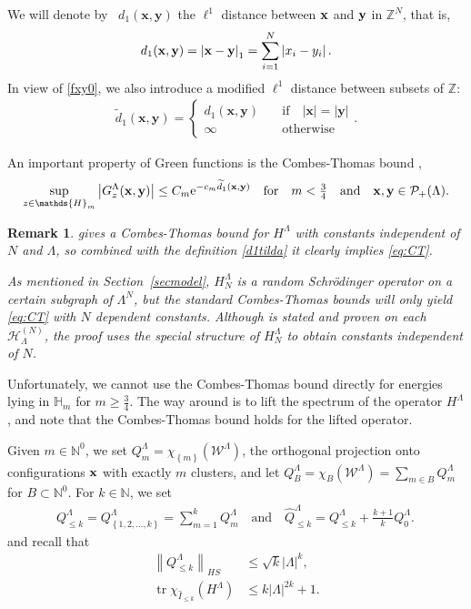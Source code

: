 \documentclass[12pt, a4paper,reqno]{amsart}
\numberwithin{equation}{section}
\newtheorem{remark}[theorem]{Remark}
\DeclareMathOperator{\tr}{tr}
\newcommand\N{\mathbb N}
\newcommand\Z{\mathbb Z}
\newcommand\cW{\mathcal{W}}
\newcommand\x{\mathbf{x}}
\newcommand\y{\mathbf{y}}
\newcommand\e{\mathrm{e}}
\newcommand\cH{\mathcal{H}}
\newcommand\cP{\mathcal{P}}
\newcommand\what{\widehat}
\newcommand\wtilde{\widetilde}
\newcommand\be{\begin{equation}\begin{aligned}}
\newcommand\ee{\end{aligned}\end{equation}}
\newcommand{\abs}[1]{\left\lvert #1 \right\rvert}
\newcommand{\norm}[1]{\left\lVert #1 \right\rVert}
\newcommand{\set}[1]{\left\{ #1 \right\}}
\newcommand{\pa}[1]{\left( #1 \right)}
\newcommand\La{\Lambda}
\newcommand{\eq}[1]{\eqref{#1}}
\newcommand{\up}[1]{^{\left(#1\right)}}
\newcommand{\qtx}[1]{\quad\text{#1}\quad}
\begin{document}
 We will denote by \  $d_1(\x,\y)$ the $\ell^1$ distance between ${\bf x}$ and ${\bf y}$ in $\Z^N$, that is, 
\be\label{eq:l1di}
d_1(\x,\y)=\abs{{\bf x}-{\bf y}}_1=\sum_{i=1}^N\abs{x_i-y_i}.
\ee
In view of \eq{fxy0}, we also introduce a modified  $\ell^1$ distance between subsets of $\Z$:
\be\label{d1tilda}
 \wtilde d_1(\x,\y)= \begin{cases} d_1(\x,\y) & \qtx{if} \abs{\x}=\abs{\y}\\
 \infty & \qtx{otherwise}
 \end{cases}.
\ee 

An important property of Green functions is  the Combes-Thomas bound \cite[Proposition 4.1]{EKS1}, 
 \be\label{eq:CT}
 \sup_{z\in \mathds{H}_m } \abs{G^\La_z({\bf x},{\bf y})}\le C_m \e^{-c_m \wtilde d_1(\x,\y)} \qtx{for} m<\tfrac 34 \qtx{and}
\x ,\y \in \cP_+(\La).
\ee 
\begin{remark}  \cite[Proposition 4.1]{EKS1}  gives a Combes-Thomas bound for $H^\La$ with constants independent of $N$ and $\La$, so combined with  the definition \eq{d1tilda} it clearly implies \eq{eq:CT}.

As mentioned in Section~\ref{secmodel}, $H^\La_N$ is a random Schr\"odinger operator on a certain subgraph of $\La^N$, but the standard	 Combes-Thomas bounds will only yield \eq{eq:CT} with $N$ dependent constants.
Although \cite[Proposition 4.1]{EKS1} is stated and proven on each $\cH_\La\up{N}$, the proof uses the special structure of  $H^\La_N$ to obtain constants independent of $N$.
\end{remark}
 

Unfortunately,  we cannot use the Combes-Thomas bound directly for energies lying in $\mathds{H}_m$ for   $m\ge \frac 34$.  The way around 
is to lift the spectrum of the operator $H^\La$, and note that the Combes-Thomas bound holds for the lifted operator.  

Given  $m \in \N^0$, we set $Q_m^\Lambda=\chi_{\set{m}}\pa{\cW^\Lambda}$, the orthogonal projection onto  configurations ${\bf x}$ with exactly $m$ clusters, and let  $Q_B^\Lambda=\chi_{B}\pa{\cW^\Lambda}=\sum_{m\in B} Q_m^\Lambda$  for $ B\subset \N^0$.
 For $k\in \N$, we set 
\be\label{QkhatQ}
Q_{\le k}^\Lambda   =Q_{\set{1,2,\ldots,k}}^\Lambda =\sum_{ m=1}^k Q_m^\Lambda \qtx{and} 
\what Q_{\le k}^\Lambda   =Q_{\le k}^\Lambda + \tfrac {k+1} k Q_0^\Lambda.\,
\ee
 and recall   that \cite[Lemma~3.5]{EK22}
\begin{align}\label{trXk}
\norm{Q_{\le k}^{\Lambda}}_{HS}&\le \sqrt{k} \abs{\Lambda}^{k},\\
\label{trkH}
\tr \chi_{\what I_{\le k}}(H^\La)&\le  k\abs{\Lambda}^{2k}+1.
\end{align}
\end{document}
